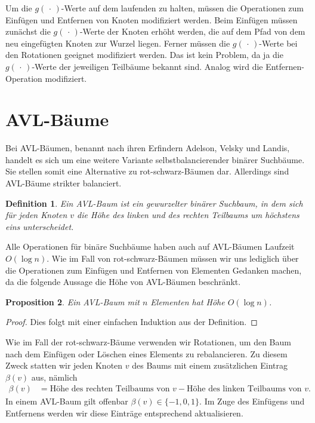\documentclass[10pt,reqno]{amsart}
\numberwithin{equation}{section}
\newcommand\nix{\,\cdot\,}
\newtheorem{definition}{Definition}[section]
\newtheorem{proposition}[definition]{Proposition}
\begin{document}
Um die $g(\nix)$-Werte auf dem laufenden zu halten, m\"ussen die Operationen zum Einf\"ugen und Entfernen von Knoten modifiziert werden.
Beim Einf\"ugen m\"ussen zun\"achst die $g(\nix)$-Werte der Knoten erh\"oht werden, die auf dem Pfad von dem neu eingef\"ugten Knoten zur Wurzel liegen.
Ferner m\"ussen die $g(\nix)$-Werte bei den Rotationen geeignet modifiziert werden.
Das ist kein Problem, da ja die $g(\nix)$-Werte der jeweiligen Teilb\"aume bekannt sind.
Analog wird die Entfernen-Operation modifiziert.


\section{AVL-B\"aume}\label{sec_avl}

\noindent
Bei AVL-B\"aumen, benannt nach ihren Erfindern Adelson, Velsky und Landis, handelt es sich um eine weitere Variante selbstbalancierender bin\"arer Suchb\"aume.
Sie stellen somit eine Alternative zu rot-schwarz-B\"aumen dar.
Allerdings sind AVL-B\"aume strikter balanciert.

\begin{definition}\label{def_avl}
	Ein AVL-Baum ist ein gewurzelter bin\"arer Suchbaum, in dem sich f\"ur jeden Knoten $v$ die H\"ohe des linken und des rechten Teilbaums um h\"ochstens eins unterscheidet.
\end{definition}

Alle Operationen f\"ur bin\"are Suchb\"aume haben auch auf AVL-B\"aumen Laufzeit $O(\log n)$.
Wie im Fall von rot-schwarz-B\"aumen m\"ussen wir uns lediglich \"uber die Operationen zum Einf\"ugen und Entfernen von Elementen Gedanken machen, da die folgende Aussage die H\"ohe von AVL-B\"aumen beschr\"ankt.

\begin{proposition}\label{prop_avl}
	Ein AVL-Baum mit $n$ Elementen hat H\"ohe $O(\log n)$.
\end{proposition}
\begin{proof}
	Dies folgt mit einer einfachen Induktion aus der Definition.
\end{proof}

Wie im Fall der rot-schwarz-B\"aume verwenden wir Rotationen, um den Baum nach dem Einf\"ugen oder L\"oschen eines Elements zu rebalancieren.
Zu diesem Zweck statten wir jeden Knoten $v$ des Baums mit einem zus\"atzlichen Eintrag $\beta(v)$ aus, n\"amlich
\begin{align*}
	\beta(v)&=\mbox{H\"ohe des rechten Teilbaums von $v$}-\mbox{H\"ohe des linken Teilbaums von $v$}.
\end{align*}
In einem AVL-Baum gilt offenbar $\beta(v)\in\{-1,0,1\}$.
Im Zuge des Einf\"ugens und Entfernens werden wir diese Eintr\"age entsprechend aktualisieren.
\end{document}
